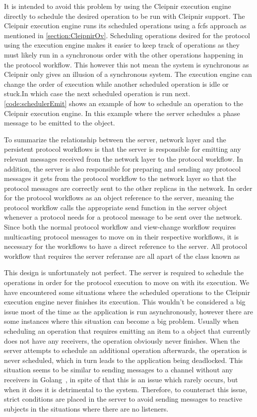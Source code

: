 It is intended to avoid this problem by using the Cleipnir execution engine directly to schedule the desired operation to be run with Cleipnir support. The Cleipnir execution engine runs its scheduled operations using a \ac{fcfs} approach as mentioned in \autoref{section:CleipnirOv}. Scheduling operations desired for the protocol using the execution engine makes it easier to keep track of operations as they must likely run in a synchronous order with the other operations happening in the protocol workflow. This however this not mean the system is synchronous as Cleipnir only gives an illusion of a synchronous system. The execution engine can change the order of execution while another scheduled operation is idle or stuck.In which case the next scheduled operation is run next. \autoref{code:schedulerEmit} shows an example of how to schedule an operation to the Cleipnir execution engine. In this example where the server schedules a phase message to be emitted to the   object.

To summarize the relationship between the server, network layer and the persistent protocol workflows is that the server is responsible for emitting any relevant messages received from the network layer to the protocol workflow. In addition, the server is also responsible for preparing and sending any protocol messages it gets from the protocol workflow to the network layer so that the protocol messages are correctly sent to the other replicas in the network. In order for the protocol workflows as an object reference to the server, meaning the protocol workflow calls the appropriate send function in the server object whenever a protocol needs for a protocol message to be sent over the network. Since both the normal protocol workflow and view-change workflow requires multicasting protocol messages to move on in their respective workflows, it is necessary for the workflows to have a direct reference to the server. All protocol workflow that requires the server referanse are all apart of the class known as  

This design is unfortunately not perfect. The server is required to schedule the operations in order for the protocol execution to move on with its execution. We have encountered some situations where the scheduled operations to the Cleipnir execution engine never finishes its execution. This wouldn’t be considered a big issue most of the time as the application is run asynchronously, however there are some instances where this situation can become a big problem. Usually when scheduling an operation that requires emitting an item to a  object that currently does not have any receivers, the operation obviously never finishes. When the server attempts to schedule an additional operation afterwards, the operation is never scheduled, which in turn leads to the application being deadlocked. This situation seems to be similar to sending messages to a channel without any receivers in Golang~\cite{WEB:golangChannels}, in spite of that this is an issue which rarely occurs, but when it does it is detrimental to the system. Therefore, to counteract this issue, strict conditions are placed in the server to avoid sending messages to reactive subjects in the situations where there are no listeners.

